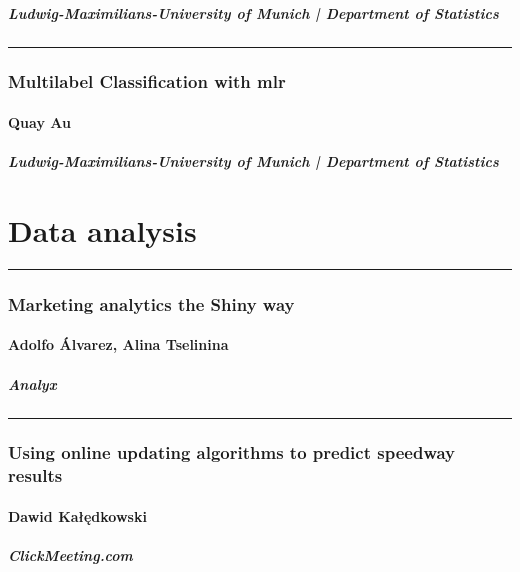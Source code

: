 \documentclass [12pt]{article}
\begin{document}
\subsubsection*{Ludwig-Maximilians-University of Munich | Department of Statistics}

\noindent\rule{\textwidth}{1pt}
\section{Multilabel Classification with mlr}
\subsection*{Quay Au}
\subsubsection*{Ludwig-Maximilians-University of Munich | Department of Statistics}
\newpage
{}
\part{Data analysis}

\noindent\rule{\textwidth}{1pt}
\section{Marketing analytics the Shiny way}
\subsection*{Adolfo Álvarez, Alina Tselinina}
\subsubsection*{Analyx}

\noindent\rule{\textwidth}{1pt}
\section{Using online updating algorithms to predict speedway results}
\subsection*{Dawid	Kałędkowski}
\subsubsection*{ClickMeeting.com}
\end{document}
